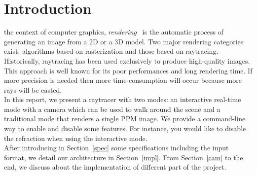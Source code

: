 \documentclass[a4paper,12pt,journal,twoside,compsoc]{PPIEEEtran}
\begin{document}


\maketitle

\IEEEdisplaynontitleabstractindextext
\IEEEpeerreviewmaketitle
\section{Introduction}
%
%
 the context of computer graphics, \textit{rendering}~\cite{rendering} is the automatic process of generating an image from a 2D or a 3D model. Two major rendering categories exist: algorithms based on rasterization and those based on raytracing. Historically, raytracing has been used exclusively to produce high-quality images. This approach is well known for its poor performances and long rendering time. If more precision is needed then more time-consumption will occur because more rays will be casted.\\
\indent In this report, we present a raytracer with two modes: an interactive
real-time mode with a camera which can be used to walk around the scene and a
traditional mode that renders a single PPM image. We provide a command-line way
to enable and disable some features. For instance, you would like to disable
the refraction when using the interactive mode.\\
\indent After introducing in Section~\ref{spec} some specifications including
the input format, we detail our architecture in Section~\ref{impl}. From
Section~\ref{cam} to the end, we discuss about the implementation of
different part of the project.
\end{document}
